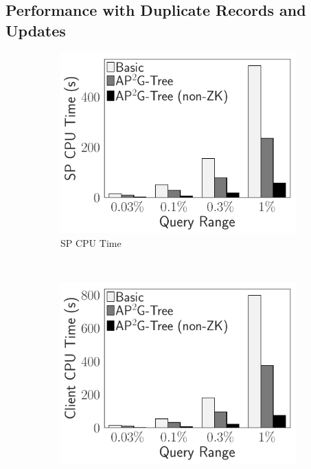 \subsection{Performance with Duplicate Records and Updates}

\begin{figure}[t]
    \centering
    \begin{subfigure}{.33\linewidth}
        \includegraphics[width=\linewidth]{exp-figs/access-control/dup_sp.pdf}
        \caption{SP CPU Time}
    \end{subfigure}~%
    \begin{subfigure}{.33\linewidth}
        \includegraphics[width=\linewidth]{exp-figs/access-control/dup_user.pdf}

\end{subfigure}
\end{figure}
